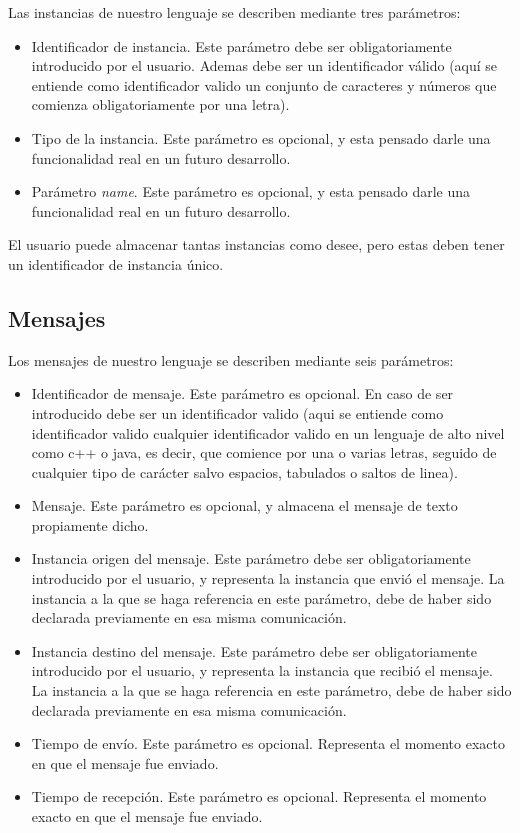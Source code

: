 \documentclass[12pt,a4paper]{report}
\begin{document}
Las instancias de nuestro lenguaje se describen mediante tres parámetros:

\begin{itemize}
\item Identificador de instancia. Este parámetro debe ser obligatoriamente introducido por el usuario. Ademas debe ser un identificador válido (aquí se entiende como identificador valido un conjunto de caracteres y números que comienza obligatoriamente por una letra).
\item Tipo de la instancia. Este parámetro es opcional, y esta pensado darle una funcionalidad real en un futuro desarrollo.
\item Parámetro \textit{name}. Este parámetro es opcional, y esta pensado darle una funcionalidad real en un futuro desarrollo.
\end{itemize}

El usuario puede almacenar tantas instancias como desee, pero estas deben tener un identificador de instancia único.

\subsection{Mensajes}

Los mensajes de nuestro lenguaje se describen mediante seis parámetros:

\begin{itemize}
\item Identificador de mensaje. Este parámetro es opcional. En caso de ser introducido debe ser un identificador valido (aqui se entiende como identificador valido cualquier identificador valido en un lenguaje de alto nivel como c++ o java, es decir, que comience por una o varias letras, seguido de cualquier tipo de carácter salvo espacios, tabulados o saltos de linea).
\item Mensaje. Este parámetro es opcional, y almacena el mensaje de texto propiamente dicho.
\item Instancia origen del mensaje. Este parámetro debe ser obligatoriamente introducido por el usuario, y representa la instancia que envió el mensaje. La instancia a la que se haga referencia en este parámetro, debe de haber sido declarada previamente en esa misma comunicación.
\item Instancia destino del mensaje. Este parámetro debe ser obligatoriamente introducido por el usuario, y representa la instancia que recibió el mensaje. La instancia a la que se haga referencia en este parámetro, debe de haber sido declarada previamente en esa misma comunicación.
\item Tiempo de envío. Este parámetro es opcional. Representa el momento exacto en que el mensaje fue enviado.
\item Tiempo de recepción. Este parámetro es opcional. Representa el momento exacto en que el mensaje fue enviado.
\end{itemize}
\end{document}
